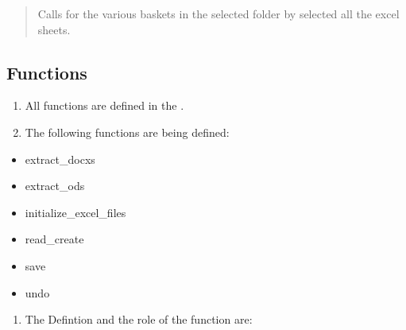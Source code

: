 \documentclass[letterpaper,10pt,english]{sphinxmanual}
\begin{document}
\begin{quote}

Calls for the various baskets in the selected folder by selected all the excel sheets.

\begin{sphinxVerbatim}[commandchars=\\\{\}]
 
     

       
              
             
\end{sphinxVerbatim}
\end{quote}


\subsection{Functions}
\label{\detokenize{developer:functions}}\begin{enumerate}
%
\item {} 
All functions are defined in the .

\item {} 
The following functions are being defined:

\end{enumerate}
\begin{itemize}
\item {} 
extract\_docxs

\item {} 
extract\_ods

\item {} 
initialize\_excel\_files

\item {} 
read\_create

\item {} 
save

\item {} 
undo

\end{itemize}
\begin{enumerate}
%
\setcounter{enumi}{2}
\item {} 
The Defintion and the role of the function are:

\end{enumerate}
\end{document}
